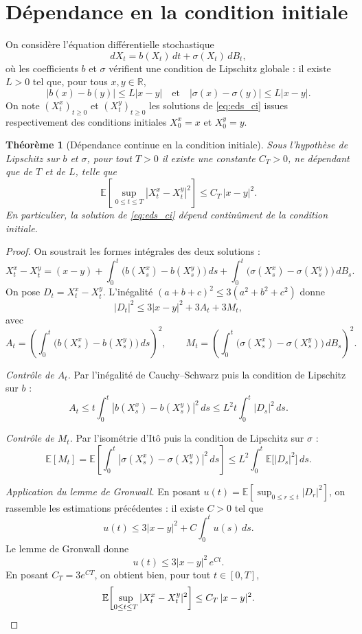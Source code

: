\documentclass[12pt,a4paper]{article}
\newtheorem{theorem}{Théorème}[section]
\theoremstyle{remark}
\begin{document}
\section{Dépendance en la condition initiale}
 
On considère l'équation différentielle stochastique
\begin{equation}
  dX_t = b(X_t)\,dt + \sigma(X_t)\,dB_t,
  \label{eq:eds_ci}
\end{equation}
où les coefficients $b$ et $\sigma$ vérifient une condition de Lipschitz globale : il existe $L > 0$ tel que, pour tous $x, y \in \mathbb{R}$,
\[
  |b(x) - b(y)| \leq L|x - y|
  \quad \text{et} \quad
  |\sigma(x) - \sigma(y)| \leq L|x - y|.
\]
On note $(X^x_t)_{t \geq 0}$ et $(X^y_t)_{t \geq 0}$ les solutions de \eqref{eq:eds_ci}
issues respectivement des conditions initiales $X^x_0 = x$ et $X^y_0 = y$.
 
\begin{theorem}[Dépendance continue en la condition initiale]
Sous l'hypothèse de Lipschitz sur $b$ et $\sigma$, pour tout $T > 0$ il existe une constante $C_T > 0$, ne dépendant que de $T$ et de $L$, telle que
\[
  \mathbb{E}\!\left[\sup_{0 \leq t \leq T} |X^x_t - X^y_t|^2\right] \leq C_T\,|x - y|^2.
\]
En particulier, la solution de \eqref{eq:eds_ci} dépend continûment de la condition initiale.
\end{theorem}
 
\begin{proof}
On soustrait les formes intégrales des deux solutions :
\[
  X^x_t - X^y_t
  = (x - y)
  + \int_0^t \bigl(b(X^x_s) - b(X^y_s)\bigr)\,ds
  + \int_0^t \bigl(\sigma(X^x_s) - \sigma(X^y_s)\bigr)\,dB_s.
\]
On pose $D_t = X^x_t - X^y_t$. L'inégalité $(a+b+c)^2 \leq 3(a^2+b^2+c^2)$ donne
\[
  |D_t|^2 \leq 3|x-y|^2 + 3A_t + 3M_t,
\]
avec
\[
  A_t = \left(\int_0^t \bigl(b(X^x_s) - b(X^y_s)\bigr)\,ds\right)^{\!2},
  \qquad
  M_t = \left(\int_0^t \bigl(\sigma(X^x_s) - \sigma(X^y_s)\bigr)\,dB_s\right)^{\!2}.
\]
 
\medskip
\noindent\textit{Contrôle de $A_t$.}
Par l'inégalité de Cauchy--Schwarz puis la condition de Lipschitz sur $b$ :
\[
  A_t \leq t\int_0^t |b(X^x_s) - b(X^y_s)|^2\,ds \leq L^2 t\int_0^t |D_s|^2\,ds.
\]
 
\medskip
\noindent\textit{Contrôle de $M_t$.}
Par l'isométrie d'It\^{o} puis la condition de Lipschitz sur $\sigma$ :
\[
  \mathbb{E}[M_t]
  = \mathbb{E}\!\left[\int_0^t |\sigma(X^x_s) - \sigma(X^y_s)|^2\,ds\right]
  \leq L^2\int_0^t \mathbb{E}\bigl[|D_s|^2\bigr]\,ds.
\]
 
\medskip
\noindent\textit{Application du lemme de Gronwall.}
En posant $u(t) = \mathbb{E}\!\left[\sup_{0 \leq r \leq t}|D_r|^2\right]$,
on rassemble les estimations précédentes : il existe $C > 0$ tel que
\[
  u(t) \leq 3|x - y|^2 + C\int_0^t u(s)\,ds.
\]
Le lemme de Gronwall donne
\[
  u(t) \leq 3|x - y|^2\,e^{Ct}.
\]
En posant $C_T = 3e^{CT}$, on obtient bien, pour tout $t \in [0,T]$,
\[
  \mathbb{E}\!\left[\sup_{0 \leq t \leq T}|X^x_t - X^y_t|^2\right] \leq C_T\,|x - y|^2. \qedhere
\]
\end{proof}
\end{document}
